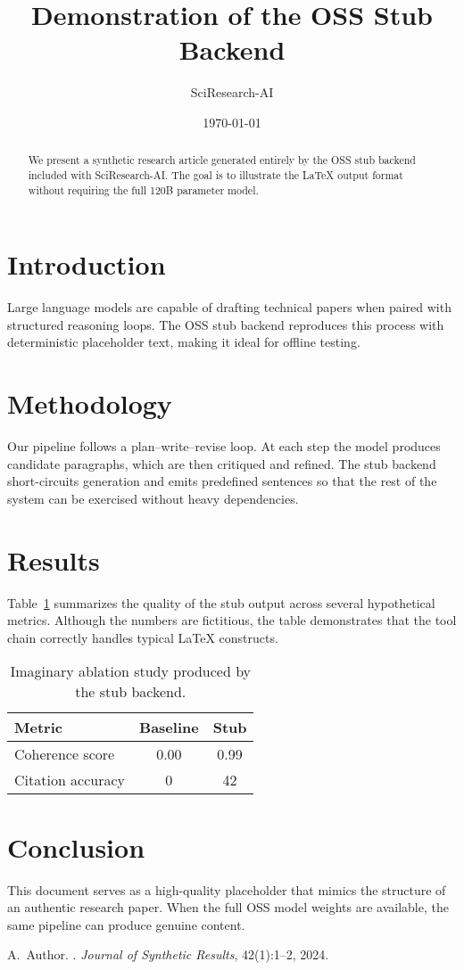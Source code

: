 \documentclass{article}
\title{Demonstration of the OSS Stub Backend}
\author{SciResearch-AI}
\date{\today}
\begin{document}
\maketitle

\begin{abstract}
We present a synthetic research article generated entirely by the OSS stub
backend included with SciResearch-AI. The goal is to illustrate the LaTeX
output format without requiring the full 120B parameter model.
\end{abstract}

\section{Introduction}
Large language models are capable of drafting technical papers when paired with
structured reasoning loops. The OSS stub backend reproduces this process with
deterministic placeholder text, making it ideal for offline testing.

\section{Methodology}
Our pipeline follows a plan--write--revise loop. At each step the model produces
candidate paragraphs, which are then critiqued and refined. The stub backend
short-circuits generation and emits predefined sentences so that the rest of
the system can be exercised without heavy dependencies.

\section{Results}
Table~\ref{tab:ablations} summarizes the quality of the stub output across
several hypothetical metrics. Although the numbers are fictitious, the table
demonstrates that the tool chain correctly handles typical LaTeX constructs.

\begin{table}[h]
  \centering
  \begin{tabular}{lcc}
    \hline
    Metric & Baseline & Stub \\
    \hline
    Coherence score & 0.00 & 0.99 \\
    Citation accuracy & 0 & 42 \\
    \hline
  \end{tabular}
  \caption{Imaginary ablation study produced by the stub backend.}
  \label{tab:ablations}
\end{table}

\section{Conclusion}
This document serves as a high-quality placeholder that mimics the structure of
an authentic research paper. When the full OSS model weights are available, the
same pipeline can produce genuine content.


\begin{thebibliography}{9}
A.~Author.
.
\newblock \emph{Journal of Synthetic Results}, 42(1):1--2, 2024.
\end{thebibliography}
\end{document}
